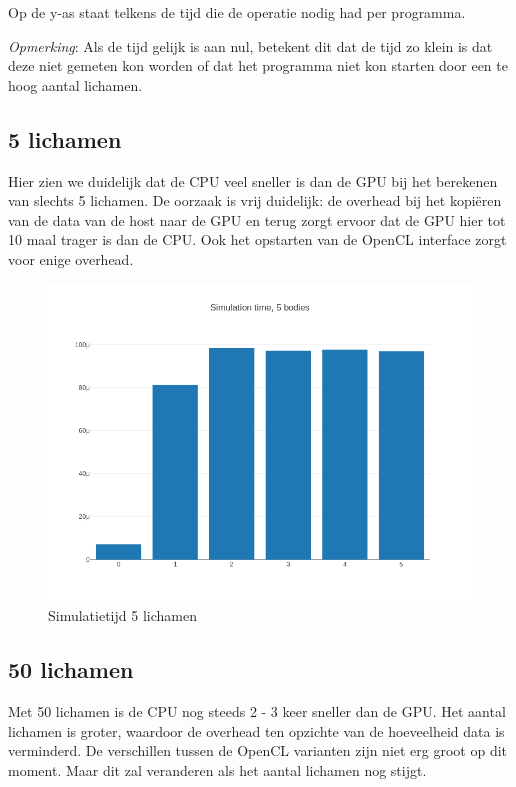 \documentclass{article}
\begin{document}
Op de y-as staat telkens de tijd die de operatie nodig had per programma.

\textit{Opmerking}: Als de tijd gelijk is aan nul, betekent dit dat de tijd zo klein is
dat deze niet gemeten kon worden of dat het programma niet kon starten door een te
hoog aantal lichamen.

\subsection{5 lichamen}

Hier zien we duidelijk dat de CPU veel sneller is dan de GPU bij het berekenen van
slechts 5 lichamen. De oorzaak is vrij duidelijk: de overhead bij het kopi\"{e}ren van
de data van de host naar de GPU en terug zorgt ervoor dat de GPU hier tot 10 maal
trager is dan de CPU. Ook het opstarten van de OpenCL interface zorgt voor enige
overhead.
\begin{figure}[H]
    \includegraphics[width=\linewidth]{./grafiekskes/hist_simulation5.png}
    \caption{Simulatietijd 5 lichamen}
\end{figure}
\subsection{50 lichamen}
Met 50 lichamen is de CPU nog steeds 2 - 3 keer sneller dan de GPU. Het aantal
lichamen is groter, waardoor de overhead ten opzichte van de hoeveelheid data
is verminderd. De verschillen tussen de OpenCL varianten zijn niet erg groot op
dit moment. Maar dit zal veranderen als het aantal lichamen nog stijgt.
\end{document}
